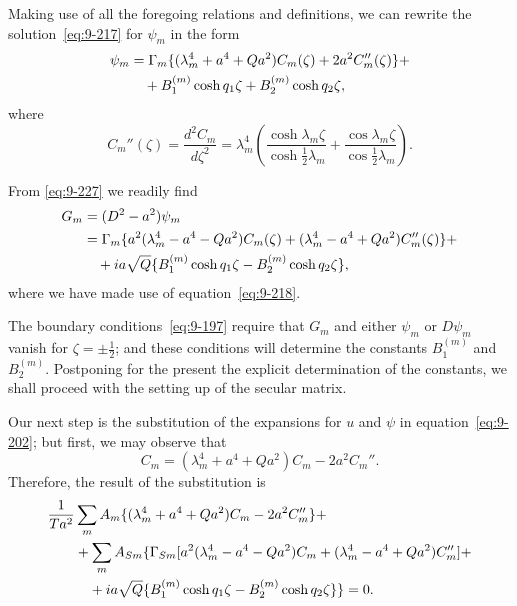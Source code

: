 Making use of all the foregoing relations and definitions, we can rewrite the solution~\eqref{eq:9-217} for $\psi_m$ in the form
\begin{align}
\psi_m &= \Gamma_m\{(\lambda_m^4 + a^4 + Qa^2)C_m(\zeta) + 2a^2 C_m''(\zeta)\} + \notag \\
&\quad + B_1^{(m)}\cosh q_1\zeta + B_2^{(m)}\cosh q_2\zeta, \label{eq:9-227}
\end{align}
where
\begin{equation}
C_m''(\zeta) = \frac{d^2 C_m}{d\zeta^2} = \lambda_m^4\left(\frac{\cosh\lambda_m\zeta}{\cosh\frac{1}{2}\lambda_m} + \frac{\cos\lambda_m\zeta}{\cos\frac{1}{2}\lambda_m}\right). \label{eq:9-228}
\end{equation}

From \eqref{eq:9-227} we readily find
\begin{align}
G_m &= (D^2 - a^2)\psi_m \notag \\
&= \Gamma_m\{a^2(\lambda_m^4 - a^4 - Qa^2)C_m(\zeta) + (\lambda_m^4 - a^4 + Qa^2)C_m''(\zeta)\} + \notag \\
&\quad + ia\sqrt{Q}\{B_1^{(m)}\cosh q_1\zeta - B_2^{(m)}\cosh q_2\zeta\}, \label{eq:9-229}
\end{align}
where we have made use of equation~\eqref{eq:9-218}.

The boundary conditions~\eqref{eq:9-197} require that $G_m$ and either $\psi_m$ or $D\psi_m$ vanish for $\zeta = \pm\frac{1}{2}$; and these conditions will determine the constants $B_1^{(m)}$ and $B_2^{(m)}$. Postponing for the present the explicit determination of the constants, we shall proceed with the setting up of the secular matrix.

Our next step is the substitution of the expansions for $u$ and $\psi$ in equation~\eqref{eq:9-202}; but first, we may observe that
\begin{equation}
[(D^2 - a^2)^2 + Qa^2]C_m = (\lambda_m^4 + a^4 + Qa^2)C_m - 2a^2 C_m''. \label{eq:9-230}
\end{equation}
Therefore, the result of the substitution is
\begin{align}
\frac{1}{\mathscr{T} a^2} &\sum_m A_m\{(\lambda_m^4 + a^4 + Qa^2)C_m - 2a^2 C_m''\} + \notag \\
&+ \sum_m A_{Sm}\{\Gamma_{Sm}[a^2(\lambda_m^4 - a^4 - Qa^2)C_m + (\lambda_m^4 - a^4 + Qa^2)C_m''] + \notag \\
&\quad + ia\sqrt{Q}\{B_1^{(m)}\cosh q_1\zeta - B_2^{(m)}\cosh q_2\zeta\}\} = 0. \label{eq:9-231}
\end{align}

